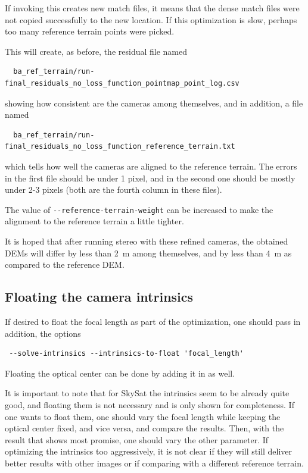 If invoking this creates new match files, it means that the dense match files 
were not copied successfully to the new location. If this optimization is slow,
perhaps too many reference terrain points were picked. 

This will create, as before, the residual file named
\begin{verbatim}
  ba_ref_terrain/run-final_residuals_no_loss_function_pointmap_point_log.csv
\end{verbatim}
showing how consistent are the cameras among themselves, 
and in addition, a file named
\begin{verbatim}
  ba_ref_terrain/run-final_residuals_no_loss_function_reference_terrain.txt
\end{verbatim}

which tells how well the cameras are aligned to the reference
terrain. The errors in the first file should be under 1 pixel, and in
the second one should be mostly under 2-3 pixels (both are the fourth
column in these files).

The value of \texttt{-\/-reference-terrain-weight} can be increased to make the 
alignment to the reference terrain a little tighter.

It is hoped that after running stereo with these refined cameras, the obtained DEMs
will differ by less than 2~m among themselves, and by less than 4~m as compared
to the reference DEM. 

\subsection{Floating the camera intrinsics}

If desired to float the focal length as part of the optimization, one should 
pass in addition, the options
\begin{verbatim}
 --solve-intrinsics --intrinsics-to-float 'focal_length'
\end{verbatim}
Floating the optical center can be done by adding it in as well. 

It is important to note that for SkySat the intrinsics seem to be already quite good,
and floating them is not necessary and is only shown for completeness. If 
one wants to float them, one should vary the focal length while keeping the optical center
fixed, and vice versa, and compare the results. Then, with the result that shows most
promise, one should vary the other parameter. If optimizing the intrinsics too aggressively,
it is not clear if they will still deliver better results with other images or 
if comparing with a different reference terrain. 


